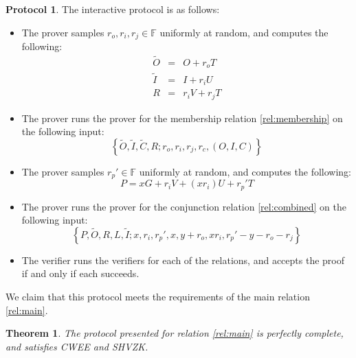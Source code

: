 \documentclass{article}
\newtheorem{theorem}{Theorem}
\theoremstyle{definition}
\newtheorem{protocol}{Protocol}
\newcommand{\FF}{\mathbb{F}}
\newcommand{\wt}[1]{\widetilde{#1}}
\begin{document}
\begin{protocol}
	The interactive protocol is as follows:
	\begin{itemize}
		\item The prover samples $r_o, r_i, r_j \in \FF$ uniformly at random, and computes the following:
		\begin{eqnarray*}
			\wt{O} &=& O + r_o T \\
			\wt{I} &=& I + r_i U \\
			R &=& r_i V + r_j T
		\end{eqnarray*}
		\item The prover runs the prover for the membership relation \ref{rel:membership} on the following input:
		\begin{equation*}
			\left\{ \wt{O}, \wt{I}, \wt{C}, R ; r_o, r_i, r_j, r_c, (O, I, C) \right\}
		\end{equation*}
		\item The prover samples $r_p' \in \FF$ uniformly at random, and computes the following:
		\begin{equation*}
			P = x G + r_i V + (x r_i) U + r_p' T
		\end{equation*}
		\item The prover runs the prover for the conjunction relation \ref{rel:combined} on the following input:
		\begin{equation*}
			\left\{ P, \wt{O}, R, L, \wt{I} ; x, r_i, r_p', x, y + r_o, x r_i, r_p' - y - r_o - r_j \right\}
		\end{equation*}
		\item The verifier runs the verifiers for each of the relations, and accepts the proof if and only if each succeeds.
	\end{itemize}
\end{protocol}

We claim that this protocol meets the requirements of the main relation \ref{rel:main}.

\begin{theorem}
	The protocol presented for relation \ref{rel:main} is perfectly complete, and satisfies CWEE and SHVZK.
\end{theorem}
\end{document}
